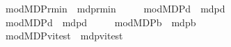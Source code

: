 \begin{isabellebody}
\ \ \ \ \ mod{\isacharunderscore}{\kern0pt}MDP{\isacharunderscore}{\kern0pt}r{\isacharunderscore}{\kern0pt}min\ {\isacharequal}{\kern0pt}\ mdp{\isachardot}{\kern0pt}r{\isacharunderscore}{\kern0pt}min\isanewline
\ \ \ \ \ mod{\isacharunderscore}{\kern0pt}MDP{\isacharunderscore}{\kern0pt}d{}\ {\isacharequal}{\kern0pt}\ mdp{\isachardot}{\kern0pt}d{}\isanewline
\ \ \ \ \ mod{\isacharunderscore}{\kern0pt}MDP{\isacharunderscore}{\kern0pt}d{}{\isacharprime}{\kern0pt}\ {\isacharequal}{\kern0pt}\ mdp{\isachardot}{\kern0pt}d{}{\isacharprime}{\kern0pt}\isanewline
\ \ \ \ \ mod{\isacharunderscore}{\kern0pt}MDP{\isacharunderscore}{\kern0pt}{\isasymnu}\isactrlsub b\ {\isacharequal}{\kern0pt}\ mdp{\isachardot}{\kern0pt}{\isasymnu}\isactrlsub b\isanewline
\ \ \ \ \ mod{\isacharunderscore}{\kern0pt}MDP{\isacharunderscore}{\kern0pt}vi{\isacharunderscore}{\kern0pt}test\ {\isacharequal}{\kern0pt}\ mdp{\isachardot}{\kern0pt}vi{\isacharunderscore}{\kern0pt}test\isanewline
%
\isadelimproof
\ \ %
\endisadelimproof
%
\isatagproof
\isacommand{{\isachardot}{\kern0pt}}\isamarkupfalse%
%
\endisatagproof
{\isafoldproof}%
%
\isadelimproof
\isanewline
%
\endisadelimproof
\isanewline
\isanewline
%
\isadelimtheory
\isanewline
%
\endisadelimtheory
%
\isatagtheory
{}\isamarkupfalse%
%
\endisatagtheory
{\isafoldtheory}%
%
\isadelimtheory
%
\endisadelimtheory
%
\end{isabellebody}%
\endinput
